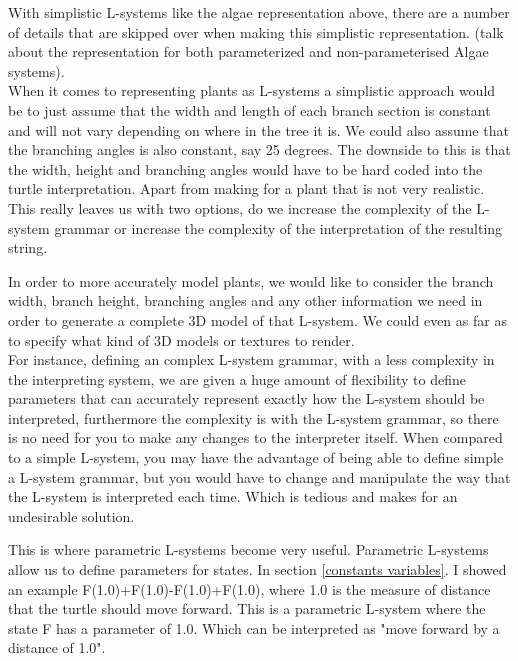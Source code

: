 \begin{flushleft}

With simplistic L-systems like the algae representation above, there are a number of details that are skipped over when making this simplistic representation. (talk about the representation for both parameterized and non-parameterised Algae systems). \\
When it comes to representing plants as L-systems a simplistic approach would be to just assume that the width and length of each branch section is constant and will not vary depending on where in the tree it is. We could also assume that the branching angles is also constant, say 25 degrees. The downside to this is that the width, height and branching angles would have to be hard coded into the turtle interpretation. Apart from making for a plant that is not very realistic. This really leaves us with two options, do we increase the complexity of the L-system grammar or increase the complexity of the interpretation of the resulting string.\\

\vspace{5mm}

In order to more accurately model plants, we would like to consider the branch width, branch height, branching angles and any other information we need in order to generate a complete 3D model of that L-system. We could even as far as to specify what kind of 3D models or textures to render.\\
For instance, defining an complex L-system grammar, with a less complexity in the interpreting system, we are given a huge amount of flexibility to define parameters that can accurately represent exactly how the L-system should be interpreted, furthermore the complexity is with the L-system grammar, so there is no need for you to make any changes to the interpreter itself. When compared to a simple L-system, you may have the advantage of being able to define simple a L-system grammar, but you would have to change and manipulate the way that the L-system is interpreted each time. Which is tedious and makes for an undesirable solution. \\

\vspace{5mm}

This is where parametric L-systems become very useful. Parametric L-systems allow us to define parameters for states. In section \ref{constants variables}. I showed an example F(1.0)+F(1.0)-F(1.0)+F(1.0), where 1.0 is the measure of distance that the turtle should move forward. This is a parametric L-system where the state F has a parameter of 1.0. Which can be interpreted as "move forward by a distance of 1.0".


\end{flushleft}
